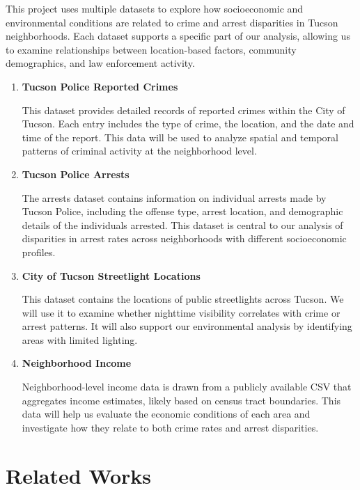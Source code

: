 \documentclass{report}
\begin{document}
This project uses multiple datasets to explore how socioeconomic and environmental conditions are related to crime and arrest disparities in Tucson neighborhoods. Each dataset supports a specific part of our analysis, allowing us to examine relationships between location-based factors, community demographics, and law enforcement activity.

\begin{enumerate}
\item \textbf{Tucson Police Reported Crimes}
  \par This dataset provides detailed records of reported crimes within the City of Tucson. Each entry includes the type of crime, the location, and the date and time of the report. This data will be used to analyze spatial and temporal patterns of criminal activity at the neighborhood level.
  
\item \textbf{Tucson Police Arrests}
  \par The arrests dataset contains information on individual arrests made by Tucson Police, including the offense type, arrest location, and demographic details of the individuals arrested. This dataset is central to our analysis of disparities in arrest rates across neighborhoods with different socioeconomic profiles.
\item \textbf{City of Tucson Streetlight Locations}
  \par This dataset contains the locations of public streetlights across Tucson. We will use it to examine whether nighttime visibility correlates with crime or arrest patterns. It will also support our environmental analysis by identifying areas with limited lighting.
  
\item \textbf{Neighborhood Income}
  \par Neighborhood-level income data is drawn from a publicly available CSV that aggregates income estimates, likely based on census tract boundaries. This data will help us evaluate the economic conditions of each area and investigate how they relate to both crime rates and arrest disparities.
\end{enumerate}

\section{Related Works}
\end{document}
